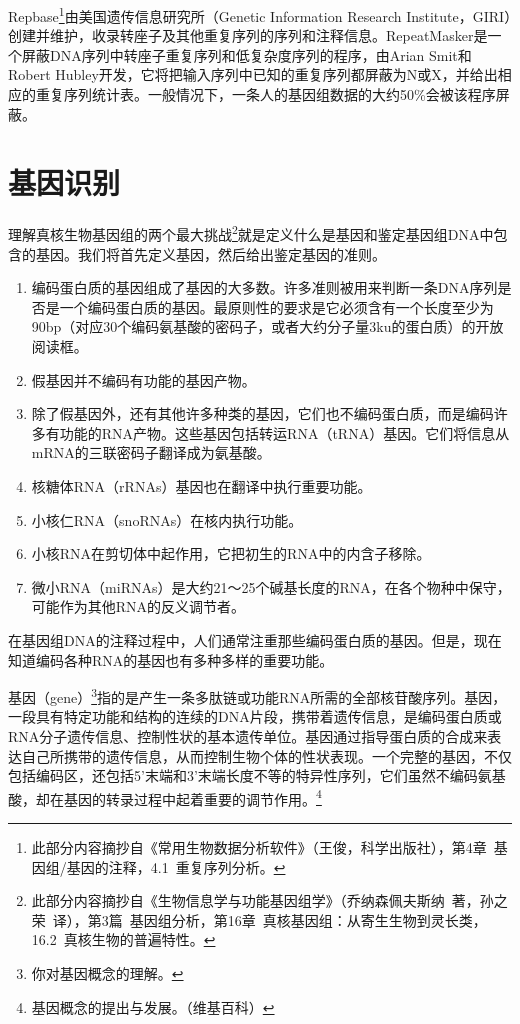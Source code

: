 \documentclass[11pt,a4paper,twoside]{book}
\begin{document}
Repbase\footnote{此部分内容摘抄自《常用生物数据分析软件》（王俊，科学出版社），第4章\ 基因组/基因的注释，4.1\ 重复序列分析。}由美国遗传信息研究所（Genetic Information Research Institute，GIRI）创建并维护，收录转座子及其他重复序列的序列和注释信息。RepeatMasker是一个屏蔽DNA序列中转座子重复序列和低复杂度序列的程序，由Arian Smit和Robert Hubley开发，它将把输入序列中已知的重复序列都屏蔽为N或X，并给出相应的重复序列统计表。一般情况下，一条人的基因组数据的大约50\%会被该程序屏蔽。


\section{基因识别}
理解真核生物基因组的两个最大挑战\footnote{此部分内容摘抄自《生物信息学与功能基因组学》（乔纳森\textbullet 佩夫斯纳\ 著，孙之荣\ 译），第3篇\ 基因组分析，第16章\ 真核基因组：从寄生生物到灵长类，16.2\ 真核生物的普遍特性。}就是定义什么是基因和鉴定基因组DNA中包含的基因。我们将首先定义基因，然后给出鉴定基因的准则。
\begin{enumerate}
  \item
    编码蛋白质的基因组成了基因的大多数。许多准则被用来判断一条DNA序列是否是一个编码蛋白质的基因。最原则性的要求是它必须含有一个长度至少为90bp（对应30个编码氨基酸的密码子，或者大约分子量3ku的蛋白质）的开放阅读框。
  \item 假基因并不编码有功能的基因产物。
  \item
    除了假基因外，还有其他许多种类的基因，它们也不编码蛋白质，而是编码许多有功能的RNA产物。这些基因包括转运RNA（tRNA）基因。它们将信息从mRNA的三联密码子翻译成为氨基酸。
  \item 核糖体RNA（rRNAs）基因也在翻译中执行重要功能。
  \item 小核仁RNA（snoRNAs）在核内执行功能。
  \item 小核RNA在剪切体中起作用，它把初生的RNA中的内含子移除。
  \item 微小RNA（miRNAs）是大约21～25个碱基长度的RNA，在各个物种中保守，可能作为其他RNA的反义调节者。
\end{enumerate}

在基因组DNA的注释过程中，人们通常注重那些编码蛋白质的基因。但是，现在知道编码各种RNA的基因也有多种多样的重要功能。

基因（gene）\footnote{你对基因概念的理解。}指的是产生一条多肽链或功能RNA所需的全部核苷酸序列。基因，一段具有特定功能和结构的连续的DNA片段，携带着遗传信息，是编码蛋白质或RNA分子遗传信息、控制性状的基本遗传单位。基因通过指导蛋白质的合成来表达自己所携带的遗传信息，从而控制生物个体的性状表现。一个完整的基因，不仅包括编码区，还包括5'末端和3'末端长度不等的特异性序列，它们虽然不编码氨基酸，却在基因的转录过程中起着重要的调节作用。\footnote{基因概念的提出与发展。（维基百科）}
\end{document}
